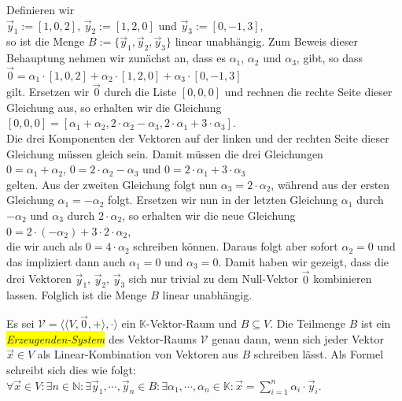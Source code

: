 \example
Definieren wir
\\[0.2cm]
\hspace*{1.3cm}
$\vec{y}_1 := [1, 0, 2]$, \quad  $\vec{y}_2 := [1, 2, 0]$ \quad und \quad $\vec{y}_3 := [0, -1, 3]$,
\\[0.2cm]
so ist die Menge $B := \{ \vec{y}_1, \vec{y}_2, \vec{y}_3 \}$
linear unabh\"{a}ngig.  Zum Beweis dieser Behauptung nehmen wir zun\"{a}chst an, dass es $\alpha_1$,
$\alpha_2$ und $\alpha_3$, gibt, so dass
\\[0.2cm]
\hspace*{1.3cm}
$\vec{0} = \alpha_1 \cdot [1,0,2] + \alpha_2 \cdot [1,2,0] + \alpha_3 \cdot [0,-1,3]$
\\[0.2cm]
gilt.  Ersetzen wir $\vec{0}$ durch die Liste $[0,0,0]$ und rechnen die rechte Seite
dieser Gleichung aus, so erhalten wir die Gleichung
\\[0.2cm]
\hspace*{1.3cm}
$[0,0,0] = [\alpha_1  + \alpha_2, 2 \cdot \alpha_2 - \alpha_3, 2 \cdot \alpha_1 + 3 \cdot \alpha_3]$.
\\[0.2cm]
Die drei Komponenten der Vektoren auf der linken und der rechten Seite dieser Gleichung m\"{u}ssen
gleich sein.  Damit m\"{u}ssen die drei Gleichungen
\\[0.2cm]
\hspace*{1.3cm}
$0 = \alpha_1 + \alpha_2$, \quad $0 = 2 \cdot \alpha_2 - \alpha_3$ \quad und \quad $0 = 2 \cdot \alpha_1 + 3 \cdot \alpha_3$
\\[0.2cm]
gelten.  Aus der zweiten Gleichung folgt nun $\alpha_3 = 2 \cdot \alpha_2$, w\"{a}hrend aus der ersten
Gleichung $\alpha_1 = - \alpha_2$ folgt.  Ersetzen wir nun in der letzten Gleichung 
$\alpha_1$ durch $-\alpha_2$ und $\alpha_3$ durch $2 \cdot \alpha_2$, so erhalten wir die neue Gleichung
\\[0.2cm]
\hspace*{1.3cm}
$0 = 2 \cdot (- \alpha_2) + 3 \cdot 2 \cdot \alpha_2$,
\\[0.2cm]
die wir auch als $0 = 4 \cdot \alpha_2$ schreiben k\"{o}nnen.  Daraus folgt aber sofort $\alpha_2 = 0$
und das impliziert dann auch $\alpha_1 = 0$ und $\alpha_3 = 0$.  Damit haben wir gezeigt, dass die drei
Vektoren $\vec{y}_1$, $\vec{y}_2$, $\vec{y}_3$ sich nur trivial zu dem Null-Vektor
$\vec{0}$ kombinieren lassen.  Folglich ist die Menge $B$ linear unabh\"{a}ngig.
\eox

\begin{Definition}
  Es sei $\mathcal{V} = \bigl\langle \langle V, \vec{0}, + \rangle, \cdot \bigr\rangle$ ein $\mathbb{K}$-Vektor-Raum 
  und $B \subseteq V$.  Die Teilmenge $B$ ist ein
  \colorbox{yellow}{\emph{Erzeugenden-System}} des Vektor-Raums $\mathcal{V}$ genau dann, wenn sich jeder Vektor 
  $\vec{x} \in V$ als Linear-Kombination von Vektoren aus $B$ schreiben l\"{a}sst. 
  Als Formel schreibt sich dies wie folgt:
  \\[0.2cm]
  \hspace*{1.3cm}
  $\forall \vec{x} \in V: \exists n \in \mathbb{N}: \exists  \vec{y}_1, \cdots,
  \vec{y}_n \in B: \exists \alpha_1, \cdots, \alpha_n \in \mathbb{K}: 
  \vec{x} = \sum\limits_{i=1}^n \alpha_i \cdot \vec{y}_i
  $. \eoxs
\end{Definition}

